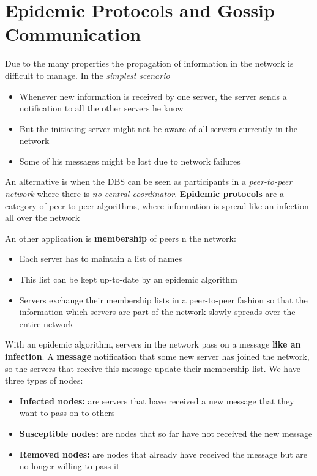 \section{Epidemic Protocols and Gossip Communication}
Due to the many properties  the propagation of information in the network is difficult to manage. In the \textit{simplest scenario} 
\begin{itemize}
    \item Whenever new information is received by one server, the server sends a notification to all the other servers he know
    \item But the initiating server might not be aware of all servers currently in the network
    \item Some of his messages might be lost due to network failures
\end{itemize}
\begin{tcolorbox}
An alternative is when the DBS can be seen as participants in a \textit{peer-to-peer network} where there is \textit{no central coordinator}. \textbf{Epidemic protocols} are a category of peer-to-peer algorithms, where information is spread like an infection all over the network
\end{tcolorbox}
An other application is \textbf{membership} of peers n the network:
\begin{itemize}
    \item Each server has to maintain a list of names
    \item This list can be kept up-to-date by an epidemic algorithm
    \item Servers exchange their membership lists in a peer-to-peer fashion so that the information which servers are part of the network slowly spreads over the entire network
\end{itemize}
With an epidemic algorithm, servers in the network pass on a message \textbf{like an infection}. A \textbf{message} notification that some new server has joined the network, so the servers that receive this message update their membership list.
We have three types of nodes:
\begin{itemize}
    \item \textbf{Infected nodes:} are servers that have received a new message that they want to pass on to others
    \item \textbf{Susceptible nodes:} are nodes that so far have not received the new message
    \item \textbf{Removed nodes:} are nodes that already have received the message but are no longer willing to pass it
\end{itemize}

